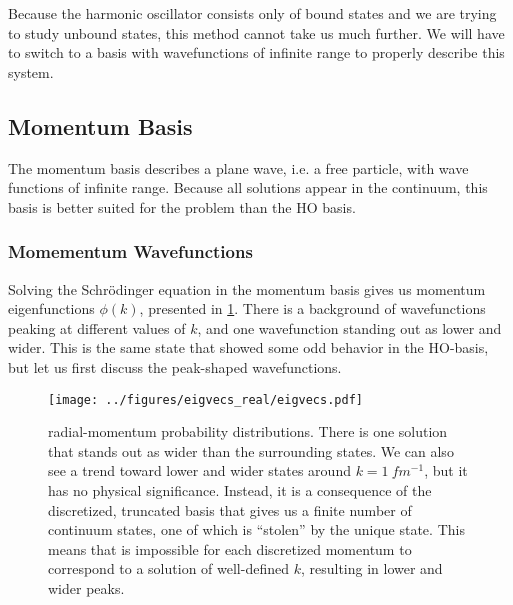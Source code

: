 \documentclass[../main/report.tex]{subfiles}
\begin{document}
Because the harmonic oscillator consists only of bound states and we are trying to study unbound states, this method cannot take us much further.
We will have to switch to a basis with wavefunctions of infinite range to properly describe this system.

\subsection{Momentum Basis}
\label{sub:momentum_basis}

The momentum basis describes a plane wave, i.e. a free particle, with wave functions of infinite range.
Because all  solutions appear in the continuum, this basis is better suited for the problem than the HO basis.

\subsubsection{Momementum Wavefunctions}

Solving the Schrödinger equation in the momentum basis gives us momentum eigenfunctions $\phi(k)$, presented in \cref{fig:real_momentum_wavefunctions}.
There is a background of wavefunctions peaking at different values of $k$, and one wavefunction standing out as lower and wider.
This is the same state that showed some odd behavior in the HO-basis, but let us first discuss the peak-shaped wavefunctions.


\begin{figure}[b!]
  \centering
  	\texttt{[image: ../figures/eigvecs\_real/eigvecs.pdf]}
  \caption{ radial-momentum probability distributions. There is one solution that stands out as wider than the surrounding states. We can also see a trend toward lower and wider states around $k = \SI{1}{fm^{-1}}$, but it has no physical significance. 
  Instead, it is a consequence of the discretized, truncated basis that gives us a finite number of continuum states, one of which is ``stolen'' by the unique state.
  This means that is impossible for each discretized momentum to correspond to a solution of well-defined $k$, resulting in lower and wider peaks.
  }
  \label{fig:real_momentum_wavefunctions}
\end{figure}
\end{document}
